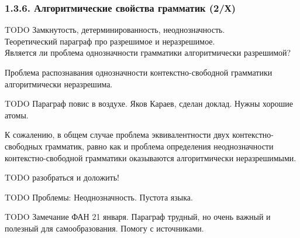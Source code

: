 \documentclass[mathserif,12pt,aspectratio=169]{beamer}
\def\DMref#1#2{{\color{blue}\underline{\hyperlink{#2}{#1}}}}
\def\TODO#1{{\color{gray} TODO {#1}}}
\begin{document}
\begin{frame}
\frametitle{1.3.6. Алгоритмические свойства грамматик (2/Х)}


\TODO{Замкнутость, детерминированность, неоднозначность. \\
Теоретический параграф про разрешимое и неразрешимое.\\
Является ли проблема однозначности грамматики алгоритмически разрешимой?}

\begin{theorem}
Проблема распознавания однозначности 
контекстно-свободной грамматики алгоритмически неразрешима.
\end{theorem}

\bigskip
\TODO{\color{blue} Параграф повис в воздухе. {\color{blue} Яков Караев, сделан доклад. Нужны хорошие атомы.}}

\medskip
К сожалению, в общем случае
проблема эквивалентности двух
контекстно-свободных грамматик,
равно как и проблема определения
неоднозначности контекстно-свободной
грамматики оказываются алгоритмически неразрешимыми. 

\medskip
\TODO{разобраться и доложить!}

\medskip
\TODO{Проблемы: Неоднозначность. Пустота языка. }

\medskip
\TODO{{\color{red} Замечание ФАН 21 января.} 
Параграф трудный, но очень важный и полезный для самообразования. Помогу с источниками. }

\end{frame}


\end{document}

